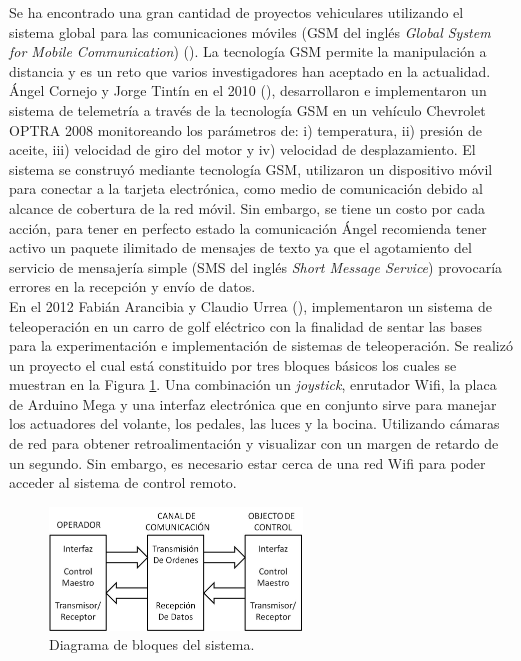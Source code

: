 Se ha encontrado una gran cantidad de proyectos vehiculares utilizando el sistema global para las comunicaciones móviles (GSM del inglés \textit{Global System for Mobile Communication}) (\cite{UPS-01,UPS-03,UPS-04,UPS-05,UPS-07}). La tecnología GSM permite la manipulación a distancia y es un reto que varios investigadores han aceptado en la actualidad.\\

Ángel Cornejo y Jorge Tintín en el 2010 (\cite{UPS-01}), desarrollaron e implementaron un sistema de telemetría a través de la tecnología GSM en un vehículo Chevrolet OPTRA 2008 monitoreando los parámetros de: i) temperatura, ii) presión de aceite, iii) velocidad de giro del motor y iv) velocidad de desplazamiento. El sistema se construyó mediante tecnología GSM, utilizaron un dispositivo móvil para conectar a la tarjeta electrónica, como medio de comunicación debido al alcance de cobertura de la red móvil. Sin embargo, se tiene un costo por cada acción, para tener en perfecto estado la comunicación Ángel recomienda tener activo un paquete ilimitado de mensajes de texto ya que el agotamiento del servicio de mensajería simple (SMS del inglés \textit{Short Message Service}) provocaría errores en la recepción y envío de datos.\\

En el 2012 Fabián Arancibia y Claudio Urrea (\cite{UPS-02}), implementaron un sistema de teleoperación en un carro de golf eléctrico con la finalidad de sentar las bases para la experimentación e implementación de sistemas de teleoperación. Se realizó un proyecto el cual está constituido por tres bloques básicos los cuales se muestran en la Figura \ref{Funo}. Una combinación un \textit{joystick}, enrutador Wifi, la placa de Arduino Mega y una interfaz electrónica que en conjunto sirve para manejar los actuadores del volante, los pedales, las luces y la bocina.  Utilizando cámaras de red para obtener retroalimentación y visualizar con un margen de retardo de un segundo. Sin embargo, es necesario estar cerca de una red Wifi para poder acceder al sistema de control remoto.\\

%
\begin{figure}[H]
\centering
\includegraphics[width=0.6\textwidth]{introduccion/fig1.jpg}
\caption{Diagrama de bloques del sistema. }
\label{Funo}
\end{figure}
%

